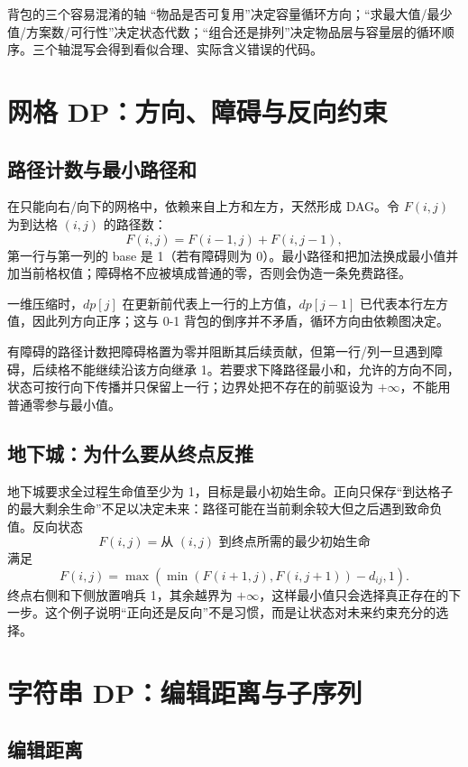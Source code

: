 \documentclass[UTF8,fontset=none,11pt,a4paper]{ctexart}
\begin{document}
\begin{warnbox}{背包的三个容易混淆的轴}
“物品是否可复用”决定容量循环方向；“求最大值/最少值/方案数/可行性”决定状态代数；“组合还是排列”决定物品层与容量层的循环顺序。三个轴混写会得到看似合理、实际含义错误的代码。
\end{warnbox}

\section{网格 DP：方向、障碍与反向约束}

\subsection{路径计数与最小路径和}

在只能向右/向下的网格中，依赖来自上方和左方，天然形成 DAG。令 $F(i,j)$ 为到达格 $(i,j)$ 的路径数：
\[
F(i,j)=F(i-1,j)+F(i,j-1),
\]
第一行与第一列的 base 是 1（若有障碍则为 0）。最小路径和把加法换成最小值并加当前格权值；障碍格不应被填成普通的零，否则会伪造一条免费路径。

一维压缩时，$dp[j]$ 在更新前代表上一行的上方值，$dp[j-1]$ 已代表本行左方值，因此列方向正序；这与 0-1 背包的倒序并不矛盾，循环方向由依赖图决定。

有障碍的路径计数把障碍格置为零并阻断其后续贡献，但第一行/列一旦遇到障碍，后续格不能继续沿该方向继承 1。若要求下降路径最小和，允许的方向不同，状态可按行向下传播并只保留上一行；边界处把不存在的前驱设为 $+\infty$，不能用普通零参与最小值。

\subsection{地下城：为什么要从终点反推}

地下城要求全过程生命值至少为 1，目标是最小初始生命。正向只保存“到达格子的最大剩余生命”不足以决定未来：路径可能在当前剩余较大但之后遇到致命负值。反向状态
\[
F(i,j)=\text{从 }(i,j)\text{ 到终点所需的最少初始生命}
\]
满足
\[
F(i,j)=\max\left(\min(F(i+1,j),F(i,j+1))-d_{ij},1\right).
\]
终点右侧和下侧放置哨兵 1，其余越界为 $+\infty$，这样最小值只会选择真正存在的下一步。这个例子说明“正向还是反向”不是习惯，而是让状态对未来约束充分的选择。

\section{字符串 DP：编辑距离与子序列}

\subsection{编辑距离}
\end{document}
